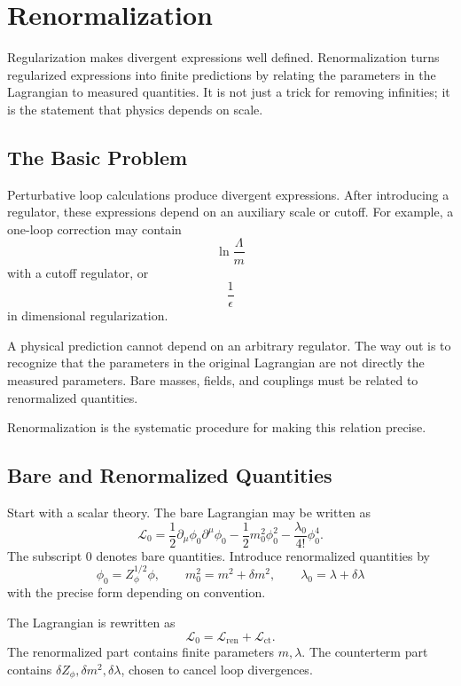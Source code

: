 \chapter{Renormalization}

\begin{remarkbox}
Regularization makes divergent expressions well defined. Renormalization turns
regularized expressions into finite predictions by relating the parameters in the
Lagrangian to measured quantities. It is not just a trick for removing infinities;
it is the statement that physics depends on scale.
\end{remarkbox}

\section{The Basic Problem}

Perturbative loop calculations produce divergent expressions. After introducing a
regulator, these expressions depend on an auxiliary scale or cutoff. For example,
a one-loop correction may contain
\[
    \ln\frac{\Lambda}{m}
\]
with a cutoff regulator, or
\[
    \frac{1}{\epsilon}
\]
in dimensional regularization.

A physical prediction cannot depend on an arbitrary regulator. The way out is to
recognize that the parameters in the original Lagrangian are not directly the
measured parameters. Bare masses, fields, and couplings must be related to
renormalized quantities.

Renormalization is the systematic procedure for making this relation precise.

\section{Bare and Renormalized Quantities}

Start with a scalar theory. The bare Lagrangian may be written as
\[
    \mathcal{L}_0
    = \frac{1}{2}\partial_\mu\phi_0\partial^\mu\phi_0
      -\frac{1}{2}m_0^2\phi_0^2
      -\frac{\lambda_0}{4!}\phi_0^4.
\]
The subscript \(0\) denotes bare quantities. Introduce renormalized quantities by
\[
    \phi_0=Z_\phi^{1/2}\phi,
    \qquad
    m_0^2=m^2+\delta m^2,
    \qquad
    \lambda_0=\lambda+\delta\lambda
\]
with the precise form depending on convention.

The Lagrangian is rewritten as
\[
    \mathcal{L}_0=\mathcal{L}_{\mathrm{ren}}+\mathcal{L}_{\mathrm{ct}}.
\]
The renormalized part contains finite parameters \(m,\lambda\). The counterterm
part contains \(\delta Z_\phi,\delta m^2,\delta\lambda\), chosen to cancel loop
divergences.

